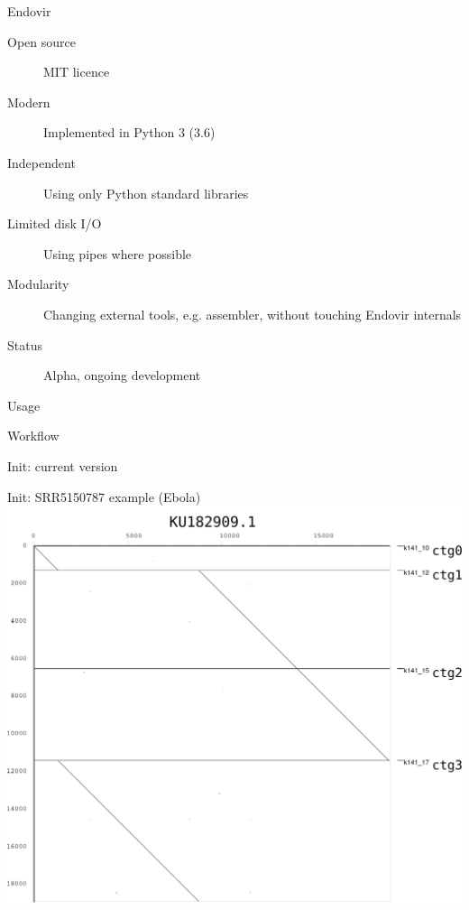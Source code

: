 \documentclass{beamer}
\begin{document}
  \begin{frame}{Endovir}
    \begin{description}
      \item[Open source] MIT licence
      \item[Modern] Implemented in Python 3 (3.6)
      \item[Independent] Using only Python standard libraries
      \item[Limited disk I/O] Using pipes where possible
      \item[Modularity] Changing external tools, e.g. assembler,
                         without touching Endovir internals
      \item[Status] Alpha, ongoing development
    \end{description}
  \end{frame}

  \begin{frame}{Usage}
    
  \end{frame}

  \begin{frame}{Workflow}
    \resizebox{\linewidth}{!}{}
  \end{frame}


  \begin{frame}{Init: current version}
    \resizebox{\linewidth}{!}{}
  \end{frame}

  \begin{frame}{Init: SRR5150787 example (Ebola)}
    \includegraphics[width=0.9\linewidth]{figs/ebovexample/ebov_contigs.pdf}
  \end{frame}
\end{document}
